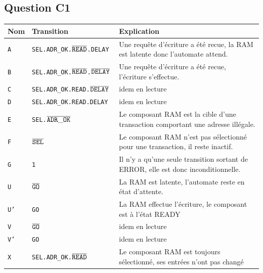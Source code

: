 \documentclass{article}
\begin{document}
\subsection{Question C1}

\begin{table}[H]
\centering
\begingroup
\setlength{\tabcolsep}{5pt}
\renewcommand{\arraystretch}{1.1}
\begin{tabular}{ | l | l | l | }
\hline
Nom    &   Transition  &    Explication \\
\hline
\texttt{A}  &   \tt{SEL.ADR\_OK.$\overline{\tt{READ}}$.DELAY                     } &
Une requête d'écriture a été recue, la RAM est latente donc l'automate attend. \\
\texttt{B}  &   \tt{SEL.ADR\_OK.$\overline{\tt{READ}}$.$\overline{\tt{DELAY}}$        } &
Une requête d'écriture a été recue, l'écriture s'effectue. \\
\texttt{C}  &   \tt{SEL.ADR\_OK.READ.$\overline{\tt{DELAY}}$                     } &
idem en lecture \\
\texttt{D}  &   \tt{SEL.ADR\_OK.READ.DELAY                                  } &
idem en lecture \\
\texttt{E}  &   \tt{SEL.$\overline{\tt{ADR\_OK}}$                                } &
Le composant RAM est la cible d'une transaction comportant une adresse illégale. \\
\texttt{F}  &   \tt{$\overline{\tt{SEL}}$                                        } &
Le composant RAM n'est pas sélectionné pour une transaction, il reste inactif. \\
\texttt{G}  &   \tt{1                                                       } &
Il n'y a qu'une seule transition sortant de ERROR, elle est donc inconditionnelle. \\
\hline
\texttt{U}  &   \tt{$\overline{\tt{GO}}$                                         } &
La RAM est latente, l'automate reste en état d'attente. \\
\texttt{U'} &   \tt{GO                                                      } &
La RAM effectue l'écriture, le composant est à l'état READY \\
\hline
\texttt{V}  &   \tt{$\overline{\tt{GO}}$                                         } &
idem en lecture \\
\texttt{V'} &   \tt{GO                                                      } &
idem en lecture \\
\hline
\texttt{X}  &   \tt{SEL.ADR\_OK.$\overline{\tt{READ}}$                           } &
Le composant RAM est toujours sélectionné, ses entrées n'ont pas changé \\

\end{tabular}
\end{table}
\end{document}
